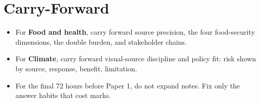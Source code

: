 \documentclass[11pt,a4paper]{article}
\newcommand{\term}[1]{\textcolor{HeadingBlue}{\textbf{#1}}}
\begin{document}
\section{Carry-Forward}

\begin{itemize}
  \item For \term{Food and health}, carry forward source precision, the four
  food-security dimensions, the double burden, and stakeholder chains.
  \item For \term{Climate}, carry forward visual-source discipline and policy
  fit: risk shown by source, response, benefit, limitation.
  \item For the final 72 hours before Paper 1, do not expand notes. Fix only
  the answer habits that cost marks.
\end{itemize}
\end{document}
